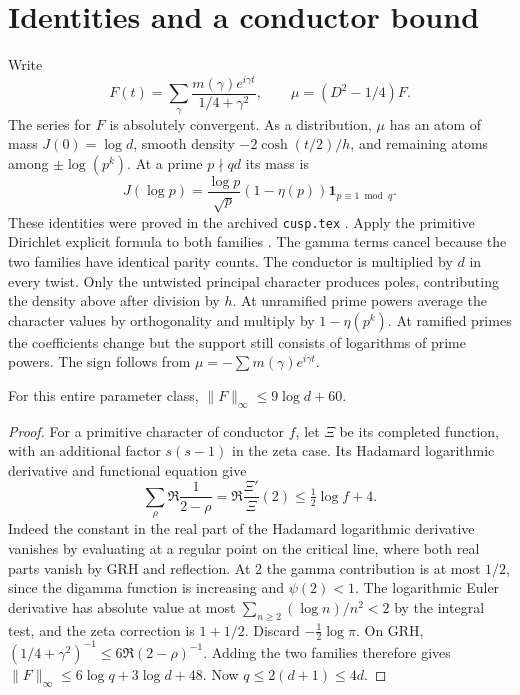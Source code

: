 \documentclass[11pt]{article}
\begin{document}
\section{Identities and a conductor bound}
Write
\[
 F(t)=\sum_\gamma\frac{m(\gamma)e^{i\gamma t}}{1/4+\gamma^2},
 \qquad \mu=(D^2-1/4)F.
\]
The series for $F$ is absolutely convergent. As a distribution, $\mu$
has an atom of mass $J(0)=\log d$, smooth density
$-2\cosh(t/2)/h$, and remaining atoms among $\pm\log(p^k)$.
At a prime $p\nmid qd$ its mass is
\begin{equation}
 J(\log p)=\frac{\log p}{\sqrt p}(1-\eta(p))\mathbf1_{p\equiv1\bmod q}.
 \label{eq:mass}
\end{equation}
These identities were proved in the archived \texttt{cusp.tex} \cite{incoming}.
Apply the primitive Dirichlet explicit formula to both
families \cite{chirre}. The gamma terms cancel because the two families
have identical parity counts. The conductor is multiplied by $d$ in every
twist. Only the untwisted principal character produces poles, contributing
the density above after division by $h$. At unramified prime powers average
the character values by orthogonality and multiply by $1-\eta(p^k)$.
At ramified primes the coefficients change but the support
still consists of logarithms of prime powers. The sign follows from
$\mu=-\sum m(\gamma)e^{i\gamma t}$.

\begin{lemma}
For this entire parameter class, $\|F\|_\infty\le 9\log d+60$.
\end{lemma}
\begin{proof}
For a primitive character of conductor $f$, let $\Xi$ be its completed
function, with an additional factor $s(s-1)$ in the zeta case. Its
Hadamard logarithmic derivative and functional equation give
\[
 \sum_\rho \Re\frac1{2-\rho}=\Re\frac{\Xi'}{\Xi}(2)
 \le \tfrac12\log f+4.
\]
Indeed the constant in the real part of the Hadamard logarithmic
derivative vanishes by evaluating at a regular point on the critical
line, where both real parts vanish by GRH and reflection. At $2$ the
gamma contribution is at most $1/2$, since the digamma function is
increasing and $\psi(2)<1$. The logarithmic Euler derivative has absolute
value at most $\sum_{n\ge2}(\log n)/n^2<2$ by the integral test, and the
zeta correction is $1+1/2$. Discard $-\tfrac12\log\pi$. On GRH,
$(1/4+\gamma^2)^{-1}\le 6\Re(2-\rho)^{-1}$. Adding the two families
therefore gives $\|F\|_\infty\le6\log q+3\log d+48$.
Now $q\le 2(d+1)\le4d$.
\end{proof}
\end{document}
